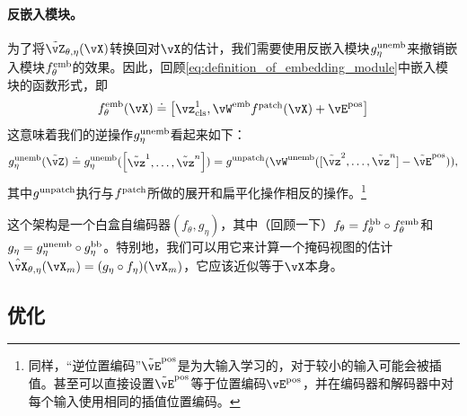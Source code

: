 \documentclass[../../book-main.tex]{subfiles}
\begin{document}
\paragraph{反嵌入模块。} 为了将\(\tilde{\vZ}_{\theta, \eta}(\vX)\)转换回对\(\vX\)的估计，我们需要使用反嵌入模块\(g_{\eta}^{\mathrm{unemb}}\)来撤销嵌入模块\(f_{\theta}^{\mathrm{emb}}\)的效果。因此，回顾\eqref{eq:definition_of_embedding_module}中嵌入模块的函数形式，即
\begin{equation}
    f_{\theta}^{\emb}(\vX) \doteq \mat{\vz_{\cls}^{1}, \vW^{\emb}f^{\patch}(\vX) + \vE^{\pos}}
\end{equation}
这意味着我们的逆操作\(g_{\eta}^{\mathrm{unemb}}\)看起来如下：
\begin{equation}
    g_{\eta}^{\unemb}(\tilde{\vZ}) \doteq g_{\eta}^{\unemb}(\mat{\tilde{\vz}^{1}, \dots, \tilde{\vz}^{n}}) = g^{\unpatch}(\vW^{\unemb}([\tilde{\vz}^{2}, \dots, \tilde{\vz}^{n}] - \tilde{\vE}^{\pos})),
\end{equation}
其中\(g^{\mathrm{unpatch}}\)执行与\(f^{\mathrm{patch}}\)所做的展开和扁平化操作相反的操作。\footnote{同样，“逆位置编码”\(\tilde{\vE}^{\pos}\)是为大输入学习的，对于较小的输入可能会被插值。甚至可以直接设置\(\tilde{\vE}^{\pos}\)等于位置编码\(\vE^{\pos}\)，并在编码器和解码器中对每个输入使用相同的插值位置编码。}

这个架构是一个白盒自编码器\((f_{\theta}, g_{\eta})\)，其中（回顾一下）\(f_{\theta} = f_{\theta}^{\mathrm{bb}} \circ f_{\theta}^{\mathrm{emb}}\)和\(g_{\eta} = g_{\eta}^{\mathrm{unemb}} \circ g_{\eta}^{\mathrm{bb}}\)。特别地，我们可以用它来计算一个掩码视图的估计\(\hat{\vX}_{\theta, \eta}(\vX_{m}) = (g_{\eta} \circ f_{\eta})(\vX_{m})\)，它应该近似等于\(\vX\)本身。

\subsection{优化}\label{sub:image_completion_optimization}
\end{document}
